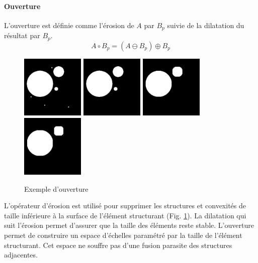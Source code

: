   \paragraph{Ouverture}
  L'ouverture est définie comme l'érosion de $A$ par $B_p$ suivie de la dilatation du résultat par $B_p$.
  \begin{equation}
   A \circ B_p = (A \ominus B_p) \oplus B_p
  \end{equation}
  \begin{figure}[h]
    \centering
    \includegraphics[height=3cm]{Images/morpho_init.png}
    \includegraphics[height=3cm]{Images/morpho_open_k5.png}
    \includegraphics[height=3cm]{Images/morpho_open_k21.png}
    \includegraphics[height=3cm]{Images/morpho_open_k31.png}
    \caption{Exemple d'ouverture}
    \label{fig:morpho_ouverture}
  \end{figure}
  L'opérateur d'érosion est utilisé pour supprimer les structures et convexités de taille inférieure à la surface de l'élément structurant (Fig. \ref{fig:morpho_ouverture}). La dilatation qui suit l'érosion permet d'assurer que la taille des éléments reste stable. L'ouverture permet de construire un espace d'échelles paramétré par la taille de l'élément structurant. Cet espace ne souffre pas d'une fusion parasite des structures adjacentes.
  
